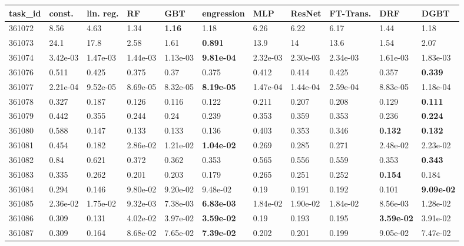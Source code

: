 \begin{table}[ht!]
\centering
\begingroup\footnotesize
\begin{tabular}{lllllllllll}
  \hline
\hline
task\_id & const. & lin. reg. & RF & GBT & engression & MLP & ResNet & FT-Trans. & DRF & DGBT \\ 
  \hline
361072 & 8.56 & 4.63 & 1.34 & \textbf{1.16} & 1.18 & 6.26 & 6.22 & 6.17 & 1.44 & 1.18 \\ 
  361073 & 24.1 & 17.8 & 2.58 & 1.61 & \textbf{0.891} & 13.9 & 14 & 13.6 & 1.54 & 2.07 \\ 
  361074 & 3.42e-03 & 1.47e-03 & 1.44e-03 & 1.13e-03 & \textbf{9.81e-04} & 2.32e-03 & 2.30e-03 & 2.34e-03 & 1.61e-03 & 1.83e-03 \\ 
  361076 & 0.511 & 0.425 & 0.375 & 0.37 & 0.375 & 0.412 & 0.414 & 0.425 & 0.357 & \textbf{0.339} \\ 
  361077 & 2.21e-04 & 9.52e-05 & 8.69e-05 & 8.32e-05 & \textbf{8.19e-05} & 1.47e-04 & 1.44e-04 & 2.59e-04 & 8.83e-05 & 1.18e-04 \\ 
  361078 & 0.327 & 0.187 & 0.126 & 0.116 & 0.122 & 0.211 & 0.207 & 0.208 & 0.129 & \textbf{0.111} \\ 
  361079 & 0.442 & 0.355 & 0.244 & 0.24 & 0.239 & 0.353 & 0.359 & 0.353 & 0.236 & \textbf{0.224} \\ 
  361080 & 0.588 & 0.147 & 0.133 & 0.133 & 0.136 & 0.403 & 0.353 & 0.346 & \textbf{0.132} & \textbf{0.132} \\ 
  361081 & 0.454 & 0.182 & 2.86e-02 & 1.21e-02 & \textbf{1.04e-02} & 0.269 & 0.285 & 0.271 & 2.48e-02 & 2.23e-02 \\ 
  361082 & 0.84 & 0.621 & 0.372 & 0.362 & 0.353 & 0.565 & 0.556 & 0.559 & 0.353 & \textbf{0.343} \\ 
  361083 & 0.335 & 0.262 & 0.201 & 0.203 & 0.179 & 0.265 & 0.251 & 0.252 & \textbf{0.154} & 0.184 \\ 
  361084 & 0.294 & 0.146 & 9.80e-02 & 9.20e-02 & 9.48e-02 & 0.19 & 0.191 & 0.192 & 0.101 & \textbf{9.09e-02} \\ 
  361085 & 2.36e-02 & 1.75e-02 & 9.32e-03 & 7.38e-03 & \textbf{6.83e-03} & 1.84e-02 & 1.90e-02 & 1.84e-02 & 8.56e-03 & 1.28e-02 \\ 
  361086 & 0.309 & 0.131 & 4.02e-02 & 3.97e-02 & \textbf{3.59e-02} & 0.19 & 0.193 & 0.195 & \textbf{3.59e-02} & 3.91e-02 \\ 
  361087 & 0.309 & 0.164 & 8.68e-02 & 7.65e-02 & \textbf{7.39e-02} & 0.202 & 0.201 & 0.199 & 9.05e-02 & 7.47e-02 \\ 

\end{tabular}
\end{table}
